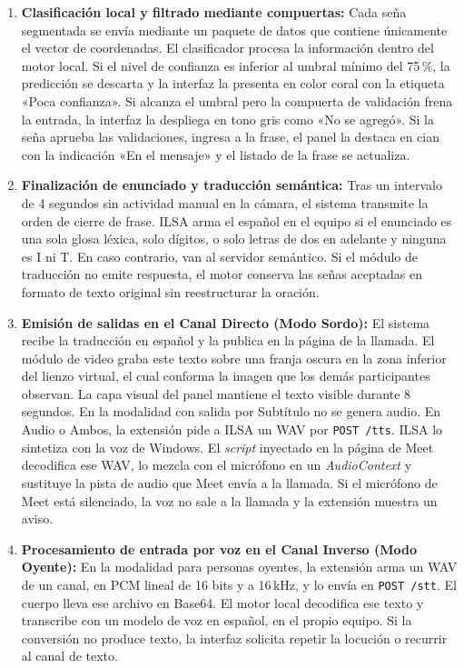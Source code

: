 \begin{enumerate}
\item \textbf{Clasificación local y filtrado mediante compuertas:} 
Cada seña segmentada se envía mediante un paquete de datos que contiene únicamente el vector de coordenadas. El clasificador procesa la información dentro del motor local. Si el nivel de confianza es inferior al umbral mínimo del 75\,\%, la predicción se descarta y la interfaz la presenta en color coral con la etiqueta «Poca confianza». Si alcanza el umbral pero la compuerta de validación frena la entrada, la interfaz la despliega en tono gris como «No se agregó». Si la seña aprueba las validaciones, ingresa a la frase, el panel la destaca en cian con la indicación «En el mensaje» y el listado de la frase se actualiza.

\item \textbf{Finalización de enunciado y traducción semántica:} 
Tras un intervalo de 4 segundos sin actividad manual en la cámara, el sistema transmite la orden de cierre de frase. ILSA arma el español en el equipo si el enunciado es una sola glosa léxica, solo dígitos, o solo letras de dos en adelante y ninguna es I ni T. En caso contrario, van al servidor semántico. Si el módulo de traducción no emite respuesta, el motor conserva las señas aceptadas en formato de texto original sin reestructurar la oración.

\item \textbf{Emisión de salidas en el Canal Directo (Modo Sordo):} 
El sistema recibe la traducción en español y la publica en la página de la llamada. El módulo de video graba este texto sobre una franja oscura en la zona inferior del lienzo virtual, el cual conforma la imagen que los demás participantes observan. La capa visual del panel mantiene el texto visible durante 8 segundos. En la modalidad con salida por Subtítulo no se genera audio. En Audio o Ambos, la extensión pide a ILSA un WAV por \texttt{POST /tts}. ILSA lo sintetiza con la voz de Windows. El \textit{script} inyectado en la página de Meet decodifica ese WAV, lo mezcla con el micrófono en un \textit{AudioContext} y sustituye la pista de audio que Meet envía a la llamada. Si el micrófono de Meet está silenciado, la voz no sale a la llamada y la extensión muestra un aviso.

\item \textbf{Procesamiento de entrada por voz en el Canal Inverso (Modo Oyente):} 
En la modalidad para personas oyentes, la extensión arma un WAV de un canal, en PCM lineal de 16 bits y a 16\,kHz, y lo envía en \texttt{POST /stt}. El cuerpo lleva ese archivo en Base64. El motor local decodifica ese texto y transcribe con un modelo de voz en español, en el propio equipo. Si la conversión no produce texto, la interfaz solicita repetir la locución o recurrir al canal de texto.


\end{enumerate}
